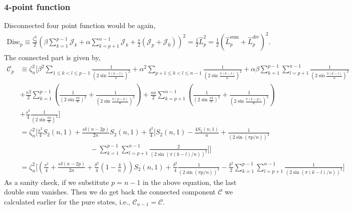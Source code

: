 \documentclass[11pt]{article}
\newcommand{\nn}{\nonumber}
\newcommand{\lb}{\left(}
\newcommand{\rb}{\right)}
\begin{document}
\subsubsection{4-point function}
Disconnected four point function would be again,
\begin{align}
    \text{Disc}_p \equiv \frac{\zeta_n^2}{2}\lb \beta \sum_{k=1}^{p-1}\mathcal{J}_k + \alpha \sum_{k=p+1}^{n-1}\mathcal{J}_k + \frac{s}{2}\lb\mathcal{J}_{p} + \mathcal{J}_{0}\rb\rb^2 = \frac{1}{2}\hat{L}^2_p = \frac{1}{2}\lb \hat{L}_p^{\text{sum}} + \hat{L}_p^{\text{div}}\rb^2 .
\end{align}
The connected part is given by,
\begin{align}
    \mathcal{C}_p &\equiv \zeta_n^2 \Bigg[ \beta^2 \sum_{1\leq k < l \leq p-1} \frac{1}{\lb2\sin \frac{\pi (k-l)}{n}\rb^2} + \alpha^2 \sum_{p+1\leq k < l \leq n-1} \frac{1}{\lb2\sin \frac{\pi (k-l)}{n}\rb^2} +\alpha\beta \sum_{k=1 }^{p-1}\sum_{l=p+1}^{n-1} \frac{1}{\lb2\sin \frac{\pi (k-l)}{n}\rb^2} \nn\\
    &+\frac{s\beta}{2} \sum_{k=1}^{p-1} \lb \frac{1}{\lb2\sin \frac{\pi k}{n}\rb^2} + \frac{1}{\lb2\sin \frac{\pi (p-k)}{n}\rb^2}  \rb + \frac{s\alpha}{2} \sum_{k=p+1}^{n-1} \lb  \frac{1}{\lb2\sin \frac{\pi k}{n}\rb^2} + \frac{1}{\lb2\sin \frac{\pi (k-p)}{n}\rb^2} \rb\nn \\
    & + \frac{s^2}{4}\frac{1}{\lb2\sin \frac{\pi p}{n}\rb^2} \Bigg]\\
    &= \zeta_n^2 \Bigg[ \frac{s^2}{4}S_2(n,1) + \frac{s\delta (n-2p)}{2n}S_2(n,1) + \frac{\delta^2 }{4}\Big[S_2(n,1) - \frac{4S_2(n,1)}{n} +\frac{1}{\lb2\sin(\pi p/n)\rb^2} \nn \\
    &\qquad \qquad \qquad \qquad \qquad - \sum_{k=1}^{p-1}\sum_{l=p+1}^{n-1}\frac{2}{\lb2\sin(\pi(k-l)/n)\rb^2} \Big]\Bigg] \\
    &= \zeta_n^2 \Bigg[ \lb\frac{s^2}{4} + \frac{s\delta (n-2p)}{2n} + \frac{\delta^2}{4}\lb1-\frac{4}{n}\rb\rb S_2(n,1) + \frac{\delta^2}{4}\frac{1}{\lb2\sin(\pi p/n)\rb^2} - \frac{\delta^2}{2}\sum_{k=1}^{p-1}\sum_{l=p+1}^{n-1}\frac{1}{\lb2\sin(\pi(k-l)/n)\rb^2}\Bigg] 
\end{align}
As a sanity check, if we substitute $p = n-1$ in the above equation, the last double sum vanishes. Then we do get back the connected component $\mathcal{C}$ we calculated earlier for the pure states, i.e., $\mathcal{C}_{n-1} = \mathcal{C}$. 
\end{document}
